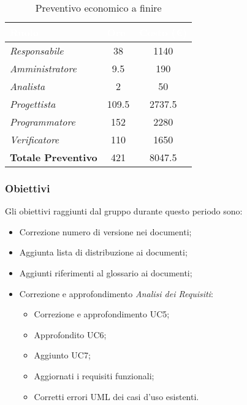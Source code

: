 \begin{table}[H]
    \renewcommand\arraystretch{1.5}
    \centering
    \begin{tabular}{|l|c|c|}
    \hline
    \rowcolor[HTML]{036400}
    \textcolor{white}{\textbf{Ruolo}} & \multicolumn{1}{l|}{\textcolor{white}{\textbf{Ore}}} & \multicolumn{1}{l|}{\textcolor{white}{\textbf{Costo (€)}}} \\ \hline
    \rowcolor[HTML]{EFEFEF}\textit{Responsabile}      & 38              & 1140                 \\ \hline
    \rowcolor[HTML]{C0C0C0}\textit{Amministratore}    & 9.5             & 190                 \\ \hline
    \rowcolor[HTML]{EFEFEF}\textit{Analista}          & 2               & 50                 \\ \hline
    \rowcolor[HTML]{C0C0C0}\textit{Progettista}       & 109.5           & 2737.5                 \\ \hline
    \rowcolor[HTML]{EFEFEF}\textit{Programmatore}     & 152             & 2280                 \\ \hline
    \rowcolor[HTML]{C0C0C0}\textit{Verificatore}      & 110             & 1650                 \\ \hline
    \rowcolor[HTML]{EFEFEF}\textbf{Totale Preventivo} & 421             & 8047.5            \\ \hline
    \end{tabular}
    \caption{Preventivo economico a finire}
\end{table}

\subsubsection{Obiettivi}
Gli obiettivi raggiunti dal gruppo durante questo periodo sono:
\begin{itemize}
    \item Correzione numero di versione nei documenti;
    \item Aggiunta lista di distribuzione ai documenti;
    \item Aggiunti riferimenti al glossario ai documenti;
    \item Correzione e approfondimento \textit{Analisi dei Requisiti}:
    \begin{itemize}
        \item Correzione e approfondimento UC5;
        \item Approfondito UC6;
        \item Aggiunto UC7;
        \item Aggiornati i requisiti funzionali;
        \item Corretti errori UML dei casi d'uso esistenti.
    \end{itemize}
\end{itemize}

